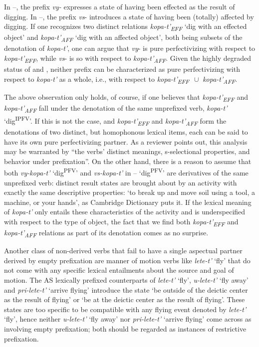 \documentclass[output=paper,colorlinks,citecolor=brown]{langscibook}
\begin{document}
\noindent In --, the prefix \textit{vy-} expresses a state of having been effected as the result of digging. In --, the prefix \textit{vs}- introduces a state of having been (totally) affected by digging. If one recognizes two distinct relations \textit{kopa-t’\textsubscript{EFF}} `dig with an effected object’ and \textit{kopa-t’\textsubscript{AFF}} `dig with an affected object’, both being subsets of the denotation of \textit{kopa-t’}, one can argue that \textit{vy}- is pure perfectivizing with respect to \textit{kopa-t’\textsubscript{EFF}},  while \textit{vs}- is so with respect to \textit{kopa-t’\textsubscript{AFF}}. Given the highly degraded status of  and , neither prefix can be characterized as pure perfectivizing with respect to \textit{kopa-t’} as a whole, i.e., with respect to \textit{kopa-t’\textsubscript{EFF}} $\,\cup$ \textit{kopa-t’\textsubscript{AFF}}.

The above observation only holds, of course, if one believes that \textit{kopa-t’\textsubscript{EFF}}{ } and \textit{kopa-t’\textsubscript{AFF}} fall under the denotation of the same unprefixed verb, \textit{kopa-t’} ‘dig\textsuperscript{IPFV}’. If this is not the case, and \textit{kopa-t’\textsubscript{EFF}} and \textit{kopa-t’\textsubscript{AFF}} form the denotations of two distinct, but homophonous lexical items, each can be said to have its own pure perfectivizing partner. As a reviewer points out, this analysis may be warranted by “the verbs’ distinct meanings, s-selectional properties, and behavior under prefixation”. On the other hand, there is a reason to assume that both \textit{vy-kopa-t’} ‘dig\textsuperscript{PFV}’ and  \textit{vs-kopa-t’} in -- ‘dig\textsuperscript{PFV}’ are derivatives of the same unprefixed verb: distinct result states are brought about by an activity with exactly the same descriptive properties: ‘to break up and move soil using a tool, a machine, or your hands’, as Cambridge Dictionary puts it. If the lexical meaning of \textit{kopa-t’} only entails these  characteristics of the activity and is underspecified with respect to the type of object, the fact that we find both  \textit{kopa-t’\textsubscript{EFF}} and \textit{kopa-t’\textsubscript{AFF}} relations as part of its denotation comes as no surprise.

Another class of non-derived verbs that fail to have a single aspectual partner derived by empty prefixation are manner of motion verbs like \textit{lete-t’} ‘fly’ that do not come with any specific lexical entailments about the source and goal of motion. The AS lexically prefixed counterparts of \textit{lete-t’} ‘fly’, \textit{u-lete-t’} ‘fly away’ and \textit{pri-lete-t’}  ‘arrive flying’ introduce the state ‘be outside of the deictic center as the result of flying’ or ‘be at the deictic center as the result of flying’. These states are too specific to be compatible with any flying event denoted by \textit{lete-t’} ‘fly’, hence neither \textit{u-lete-t’} ‘fly away’ nor \textit{pri-lete-t’} ‘arrive flying’ come across as involving empty prefixation; both should be regarded as instances of restrictive prefixation. 
\end{document}
